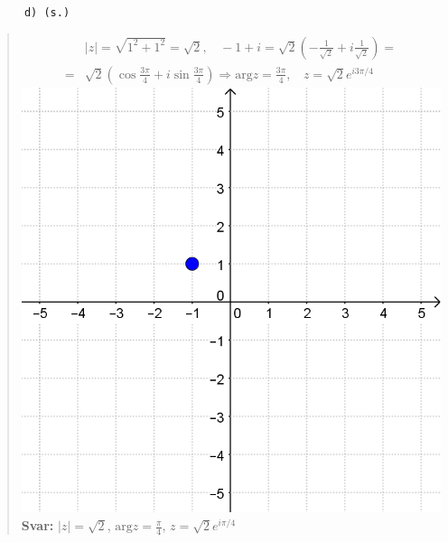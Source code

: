 \documentclass[a4paper]{article}
\newcommand{\tskcol}[1]{\textcolor{tskcol}{#1}}
\begin{document}
	\pagebreak
	\texttt{\tskcol{~~~~~~d) (s.)}}
	\begin{quotation}
		\noindent
		\begin{align*}
		&|z|=\sqrt{1^2+1^2}=\sqrt{2},~~~~ -1+i=\sqrt{2}(-\frac{1}{\sqrt{2}}+i\frac{1}{\sqrt{2}})= \\ =
		&\sqrt{2}(\cos\frac{3\pi}{4}+i\sin\frac{3\pi}{4}) \Rightarrow \text{arg}z=\frac{3\pi}{4},~~~~ z=\sqrt{2}e^{i3\pi/4}
		\end{align*}
		\includegraphics[scale=0.2]{images/619d.PNG}
		\\
		\textbf{Svar:} $|z|=\sqrt{2}$, $\text{arg}z=\frac{\pi}{4}$, $z=\sqrt{2}e^{i\pi/4}$
	\end{quotation}
	
\end{document}
